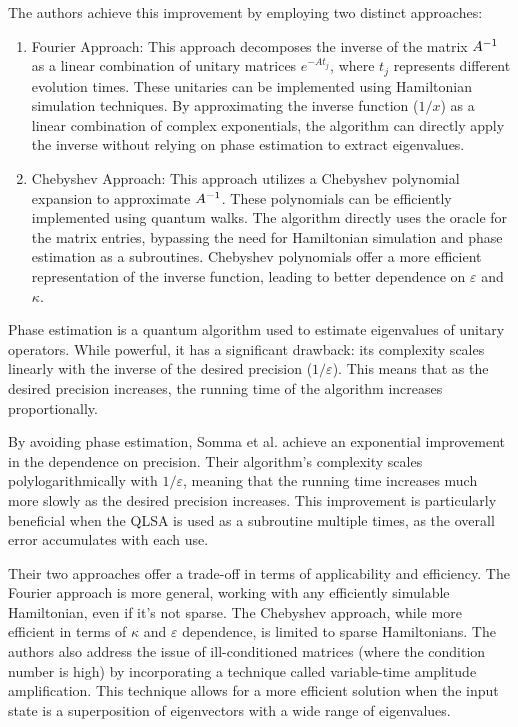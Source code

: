 \documentclass[12pt]{extarticle}
\begin{document}
The authors achieve this improvement by employing two distinct approaches:

\begin{enumerate}
\item Fourier Approach: This approach decomposes the inverse of the matrix ${{A}^{-1}}$ as a linear combination of unitary matrices
$e^{-At_j}$, where $t_j$ represents different evolution times.
These unitaries can be implemented using Hamiltonian simulation techniques.
By approximating the inverse function ($1/x$) as a linear combination of complex exponentials,
the algorithm can directly apply the inverse without relying on phase estimation to extract eigenvalues.
\item Chebyshev Approach: This approach utilizes a Chebyshev polynomial expansion to approximate ${{A}^{-1}}$.
These polynomials can be efficiently implemented using quantum walks.
The algorithm directly uses the oracle for the matrix entries, bypassing the need for Hamiltonian simulation and phase estimation as a subroutines.
Chebyshev polynomials offer a more efficient representation of the inverse function, leading to better dependence on $\varepsilon$ and $\kappa$.
\end{enumerate}

Phase estimation is a quantum algorithm used to estimate eigenvalues of unitary operators.
While powerful, it has a significant drawback: its complexity scales linearly with the inverse of the desired precision ($1/\varepsilon$).
This means that as the desired precision increases, the running time of the algorithm increases proportionally.

By avoiding phase estimation, Somma et al. achieve an exponential improvement in the dependence on precision.
Their algorithm's complexity scales polylogarithmically with $1/\varepsilon$, meaning that the running time increases much more slowly as the desired precision increases.
This improvement is particularly beneficial when the QLSA is used as a subroutine multiple times, as the overall error accumulates with each use.

Their two approaches offer a trade-off in terms of applicability and efficiency.
The Fourier approach is more general, working with any efficiently simulable Hamiltonian, even if it's not sparse.
The Chebyshev approach, while more efficient in terms of $\kappa$ and $\varepsilon$ dependence, is limited to sparse Hamiltonians.
The authors also address the issue of ill-conditioned matrices (where the condition number is high) by incorporating a technique called variable-time amplitude amplification.
This technique allows for a more efficient solution when the input state is a superposition of eigenvectors with a wide range of eigenvalues.
\end{document}
